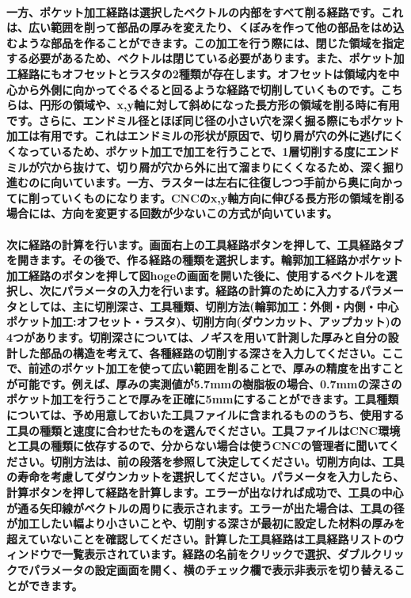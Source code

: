 \documentclass[b5paper, 9pt, twocolumn, titlepage,openany]{jsbook}%
\begin{document}
\paragraph{一方、ポケット加工経路は選択したベクトルの内部をすべて削る経路です。これは、広い範囲を削って部品の厚みを変えたり、くぼみを作って他の部品をはめ込むような部品を作ることができます。この加工を行う際には、閉じた領域を指定する必要があるため、ベクトルは閉じている必要があります。また、ポケット加工経路にもオフセットとラスタの2種類が存在します。オフセットは領域内を中心から外側に向かってぐるぐると回るような経路で切削していくものです。こちらは、円形の領域や、x,y軸に対して斜めになった長方形の領域を削る時に有用です。さらに、エンドミル径とほぼ同じ径の小さい穴を深く掘る際にもポケット加工は有用です。これはエンドミルの形状が原因で、切り屑が穴の外に逃げにくくなっているため、ポケット加工で加工を行うことで、1層切削する度にエンドミルが穴から抜けて、切り屑が穴から外に出て溜まりにくくなるため、深く掘り進むのに向いています。一方、ラスターは左右に往復しつつ手前から奥に向かってに削っていくものになります。CNCのx,y軸方向に伸びる長方形の領域を削る場合には、方向を変更する回数が少ないこの方式が向いています。}


\paragraph{次に経路の計算を行います。画面右上の工具経路ボタンを押して、工具経路タブを開きます。その後で、作る経路の種類を選択します。輪郭加工経路かポケット加工経路のボタンを押して図hogeの画面を開いた後に、使用するベクトルを選択し、次にパラメータの入力を行います。経路の計算のために入力するパラメータとしては、主に切削深さ、工具種類、切削方法(輪郭加工：外側・内側・中心 ポケット加工:オフセット・ラスタ)、切削方向(ダウンカット、アップカット)の4つがあります。切削深さについては、ノギスを用いて計測した厚みと自分の設計した部品の構造を考えて、各種経路の切削する深さを入力してください。ここで、前述のポケット加工を使って広い範囲を削ることで、厚みの精度を出すことが可能です。例えば、厚みの実測値が5.7mmの樹脂板の場合、0.7mmの深さのポケット加工を行うことで厚みを正確に5mmにすることができます。工具種類については、予め用意しておいた工具ファイルに含まれるもののうち、使用する工具の種類と速度に合わせたものを選んでください。工具ファイルはCNC環境と工具の種類に依存するので、分からない場合は使うCNCの管理者に聞いてください。切削方法は、前の段落を参照して決定してください。切削方向は、工具の寿命を考慮してダウンカットを選択してください。パラメータを入力したら、計算ボタンを押して経路を計算します。エラーが出なければ成功で、工具の中心が通る矢印線がベクトルの周りに表示されます。エラーが出た場合は、工具の径が加工したい幅より小さいことや、切削する深さが最初に設定した材料の厚みを超えていないことを確認してください。計算した工具経路は工具経路リストのウィンドウで一覧表示されています。経路の名前をクリックで選択、ダブルクリックでパラメータの設定画面を開く、横のチェック欄で表示非表示を切り替えることができます。}
\end{document}
